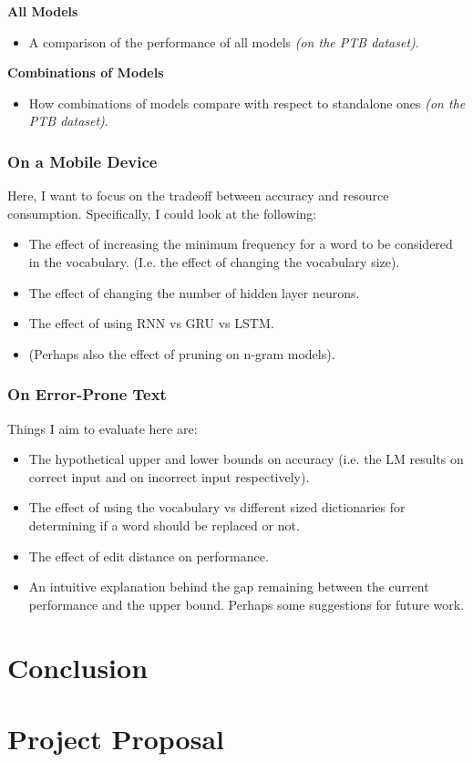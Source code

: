 \documentclass[a4paper, 12pt]{report}
\newcommand{\tbf}[1]{\textbf{#1}}
\newcommand{\tit}[1]{\textit{#1}}
\begin{document}
\tbf{All Models}
\begin{itemize}
\item
	A comparison of the performance of all models \tit{(on the PTB dataset)}.
\end{itemize}

\tbf{Combinations of Models}
\begin{itemize}
\item
	How combinations of models compare with respect to standalone ones \tit{(on the PTB dataset)}.
\end{itemize}


\subsection{On a Mobile Device}
Here, I want to focus on the tradeoff between accuracy and resource consumption. Specifically, I could look at the following: \\
\begin{itemize}
\item
	The effect of increasing the minimum frequency for a word to be considered in the vocabulary. (I.e. the effect of changing the vocabulary size).
\item
	The effect of changing the number of hidden layer neurons.
\item
	The effect of using RNN vs GRU vs LSTM.
\item
	(Perhaps also the effect of pruning on n-gram models).
\end{itemize}

\subsection{On Error-Prone Text}
Things I aim to evaluate here are: \\
\begin{itemize}
\item
	The hypothetical upper and lower bounds on accuracy (i.e. the LM results on correct input and on incorrect input respectively).
\item
	The effect of using the vocabulary vs different sized dictionaries for determining if a word should be replaced or not.
\item
	The effect of edit distance on performance.
\item
	An intuitive explanation behind the gap remaining between the current performance and the upper bound. Perhaps some suggestions for future work.
\end{itemize}

\chapter{Conclusion}



\appendix

\chapter{Project Proposal}
\end{document}
